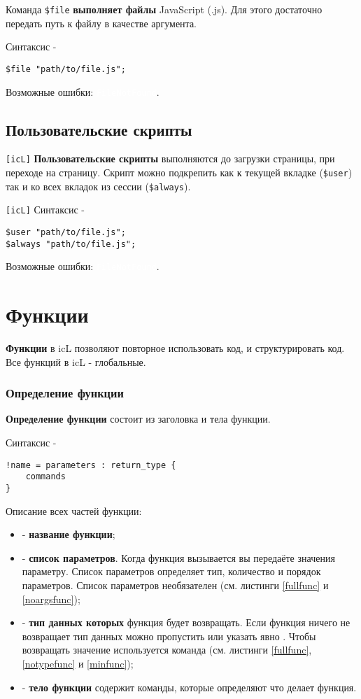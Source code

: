 \documentclass[a4paper, 14pt]{extarticle}
\newcommand{\ferror}[1]{{\fontsize{11pt}{12pt} \tt \colorbox{function}{\textcolor{white}{#1}}}}
\newenvironment{icItems}
	{ \begin{itemize} [noitemsep,nolistsep] }
	{ \end{itemize} }
\begin{document}
Команда \lstinline|$file| {\bf выполняет файлы} JavaScript (.js). Для этого достаточно передать путь к файлу в качестве аргумента.

Синтаксис -
\begin{lstlisting}[numbers=none]
$file "path/to/file.js";
\end{lstlisting}

Возможные ошибки: \ferror{FileNotFound}.

\subsection{Пользовательские скрипты}

\lstinline|[icL]| {\bf Пользовательские скрипты} выполняются до загрузки страницы, при переходе на страницу. Скрипт можно подкрепить как к текущей вкладке (\lstinline|$user|) так и ко всех вкладок из сессии (\lstinline|$always|).

\lstinline|[icL]| Синтаксис -
\begin{lstlisting}[numbers=none]
$user "path/to/file.js";
$always "path/to/file.js";
\end{lstlisting}

Возможные ошибки: \ferror{FileNotFound}.

\newpage
\section{Функции}

{\bf Функции} в icL позволяют повторное использовать код, и структурировать код. Все функций в icL - глобальные.

\subsubsection{Определение функции}

{\bf Определение функции} состоит из заголовка и тела функции.

\noindent Синтаксис -
\begin{lstlisting}[numbers=none]
!name = parameters : return_type {
	commands
}
\end{lstlisting}

Описание всех частей функции:
\begin{icItems}
\item
	 - {\bf название функции};
\item
	 - {\bf список параметров}. Когда функция вызывается вы передаёте значения параметру. Список параметров определяет тип, количество и порядок параметров. Список параметров необязателен (см. листинги \ref{fullfunc} и \ref{noargsfunc});
\item
	 - {\bf тип данных которых} функция будет возвращать. Если функция ничего не возвращает тип данных можно пропустить или указать явно \void{}. Чтобы возвращать значение используется команда  (см. листинги \ref{fullfunc}, \ref{notypefunc} и \ref{minfunc});
\item
	 - {\bf тело функции} содержит команды, которые определяют что делает функция.
\end{icItems}
\end{document}
